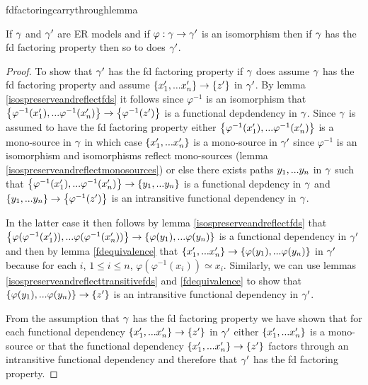 fdfactoringcarrythroughlemma
\begin{lemma}
\label{fdfactoringcarrythroughlemma}
If $\gamma$ and $\gamma'$ are ER models and if $\varphi:\gamma \rightarrow \gamma'$ is an isomorphism
then if $\gamma$ has the fd factoring property then so to does $\gamma'$.
\end{lemma}
\begin{proof}
To show that $\gamma'$ has the fd factoring property if $\gamma$ does assume $\gamma$ has the fd factoring property and assume $\left\{x'_1,...x'_n\right\} \rightarrow \left\{z'\right\}$ in $\gamma'$. 
By lemma \ref{isospreserveandreflectfds} it follows since $\varphi^{-1}$ is an isomorphism that $\left\{\varphi^{-1}(x'_1),...\varphi^{-1}(x'_n)\right\} \rightarrow \left\{\varphi^{-1}(z')\right\}$ is a functional depdendency
in $\gamma$. Since $\gamma$ is assumed to have the fd factoring property either $\left\{\varphi^{-1}(x'_1),...\varphi^{-1}(x'_n)\right\}$ is a mono-source in $\gamma$ in which case $\left\{x'_1,...x'_n\right\}$ is a mono-source in 
$\gamma'$ since $\varphi^{-1}$ is an isomorphism  and isomorphisms reflect mono-sources (lemma \ref{isospreserveandreflectmonosources}) or else there exists paths $y_1,...y_n$ in $\gamma$ such that
$\left\{\varphi^{-1}(x'_1),...\varphi^{-1}(x'_n)\right\} \rightarrow \left\{y_1,...y_n\right\}$ is a functional depdency in $\gamma$ and 
 $\left\{y_1,...y_n\right\} \rightarrow \left\{\varphi^{-1}(z')\right\}$ is an intransitive functional dependency in $\gamma$.  

In the latter case it then follows by lemma
\ref{isospreserveandreflectfds} that
 $\left\{\varphi(\varphi^{-1}(x'_1)),...\varphi(\varphi^{-1}(x'_n))\right\} \rightarrow \left\{\varphi(y_1),...\varphi(y_n)\right\}$
is a functional dependency in $\gamma'$
and then by lemma \ref{fdequivalence}  that $\left\{x'_1,...x'_n\right\} \rightarrow \left\{\varphi(y_1),...\varphi(y_n)\right\}$ in $\gamma'$
because for each $i$, $1 \leq i \leq n$, $\varphi(\varphi^{-1}(x_i)) \simeq x_i$.
Similarly, we can use lemmas \ref{isospreserveandreflecttransitivefds} and \ref{fdequivalence} to show that $\left\{\varphi(y_1),...\varphi(y_n)\right\} \rightarrow \left\{z'\right\}$ is an intransitive functional dependency in $\gamma'$. 

From the assumption that $\gamma$ has the fd factoring property we have shown that for each functional dependency $\left\{x'_1,...x'_n\right\} \rightarrow \left\{z'\right\}$ in $\gamma'$ either $\left\{x'_1,...x'_n\right\}$ is a mono-source  or
that the functional dependency  $\left\{x'_1,...x'_n\right\} \rightarrow \left\{z'\right\}$ factors through an intransitive functional dependency and  therefore that $\gamma'$ has the fd factoring property.
\end{proof}


